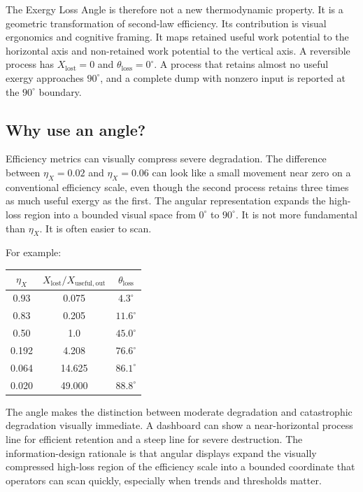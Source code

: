 \documentclass[11pt]{article}
\newcommand{\thetaloss}{\theta_{\mathrm{loss}}}
\begin{document}
The Exergy Loss Angle is therefore not a new thermodynamic property. It is a geometric transformation of second-law efficiency. Its contribution is visual ergonomics and cognitive framing. It maps retained useful work potential to the horizontal axis and non-retained work potential to the vertical axis. A reversible process has $X_{\mathrm{lost}}=0$ and $\thetaloss=0^{\circ}$. A process that retains almost no useful exergy approaches $90^{\circ}$, and a complete dump with nonzero input is reported at the $90^{\circ}$ boundary.

\subsection{Why use an angle?}

Efficiency metrics can visually compress severe degradation. The difference between $\eta_X=0.02$ and $\eta_X=0.06$ can look like a small movement near zero on a conventional efficiency scale, even though the second process retains three times as much useful exergy as the first. The angular representation expands the high-loss region into a bounded visual space from $0^{\circ}$ to $90^{\circ}$. It is not more fundamental than $\eta_X$. It is often easier to scan.

For example:
\begin{center}
\begin{tabular}{@{}ccc@{}}
\toprule
$\eta_X$ & $X_{\mathrm{lost}}/X_{\mathrm{useful,out}}$ & $\thetaloss$ \\
\midrule
0.93 & 0.075 & $4.3^{\circ}$ \\
0.83 & 0.205 & $11.6^{\circ}$ \\
0.50 & 1.0 & $45.0^{\circ}$ \\
0.192 & 4.208 & $76.6^{\circ}$ \\
0.064 & 14.625 & $86.1^{\circ}$ \\
0.020 & 49.000 & $88.8^{\circ}$ \\
\bottomrule
\end{tabular}
\end{center}
The angle makes the distinction between moderate degradation and catastrophic degradation visually immediate. A dashboard can show a near-horizontal process line for efficient retention and a steep line for severe destruction. The information-design rationale is that angular displays expand the visually compressed high-loss region of the efficiency scale into a bounded coordinate that operators can scan quickly, especially when trends and thresholds matter.
\end{document}
